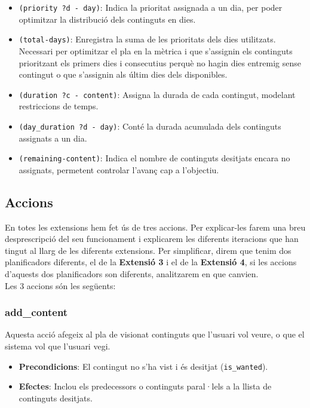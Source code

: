 \documentclass[a4paper]{article}
\begin{document}
	\begin{itemize}
		\item \texttt{(priority ?d - day)}: Indica la prioritat assignada a un dia, per poder optimitzar la distribució dels continguts en dies.
		\item \texttt{(total-days)}: Enregistra la suma de les prioritats dels dies utilitzats. Necessari per optimitzar el pla en la mètrica i que s'assignin els continguts prioritzant els primers dies i consecutius perquè no hagin dies entremig sense contingut o que s'assignin als últim dies dels disponibles.
		\item \texttt{(duration ?c - content)}: Assigna la durada de cada contingut, modelant restriccions de temps.
		\item \texttt{(day\_duration ?d - day)}: Conté la durada acumulada dels continguts assignats a un dia.
		\item \texttt{(remaining-content)}: Indica el nombre de continguts desitjats encara no assignats, permetent controlar l'avanç cap a l'objectiu.
	
	\end{itemize}
	
	\subsection{Accions}
	
	En totes les extensions hem fet ús de tres accions. Per explicar-les farem una breu desprescripció del seu funcionament i explicarem les diferents iteracions que han tingut al llarg de les diferents extensions. Per simplificar, direm que tenim dos planificadors diferents, el de la \textbf{Extensió 3} i el de la \textbf{Extensió 4}, si les accions d'aquests dos planificadors son diferents, analitzarem en que canvien. \\
	
	Les 3 accions són les següents:
	
	\subsubsection*{add\_content}
	
	Aquesta acció afegeix al pla de visionat continguts que l'usuari vol veure, o que el sistema vol que l'usuari vegi.
	
	\begin{itemize}
		\item \textbf{Precondicions}: El contingut no s'ha vist i és desitjat (\texttt{is\_wanted}).
		\item \textbf{Efectes}: Inclou els predecessors o continguts paral·lels a la llista de continguts desitjats.
	\end{itemize}
	
\end{document}
